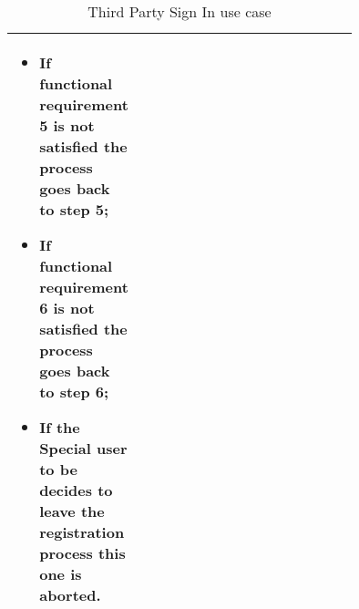 \begin{center}
\begin{table}
\begin{tabular}{ | l | p{0.75\linewidth} | }
\begin{minipage}[t]{0.7\textwidth}
\begin{itemize}
      \item If functional requirement 5 is not satisfied the process goes back to step 5;
      \item If functional requirement 6 is not satisfied the process goes back to step 6;
      \item If the \textbf{Special user to be} decides to leave the registration process this one is aborted.
    \end{itemize}
    \smallskip
  \end{minipage}  \\ \hline
\end{tabular}
\caption{Third Party Sign In use case}
\label{table:thirdPartySignInTable}
\end{table}
\end{center}
